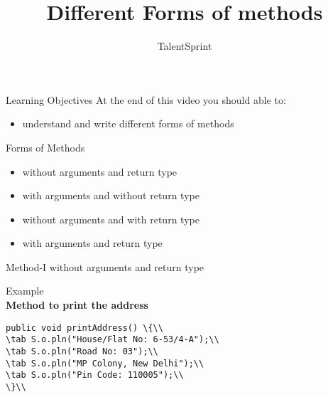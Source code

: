 \documentclass[aspectratio=169,14pt,usenames,dvipsnames]{beamer}
\title[Different Forms of methods]{Different Forms of methods}
\newcommand\tab[1][1cm]{\hspace*{#1}}
\begin{document}
{\1
\begin{frame} \vspace{35pt}

\subtitle{TalentSprint}
\maketitle
\end{frame}
}

\begin{frame}{Learning Objectives}
At the end of this video you should able to:
\begin{itemize}
\item understand and write different forms of
methods
\end{itemize}
\end{frame}

\begin{frame}{Forms of Methods}
\begin{itemize}
    \item without arguments and return type
    \item with arguments and without return type
    \item without arguments and with return type
    \item with arguments and return type
\end{itemize}
\end{frame}



\begin{frame}{Method-I}
without arguments and return type\\
\begin{block}{Example}\\
\textbf{Method to print the address}\\
\begin{lstlisting}
public void printAddress() \{\\
\tab S.o.pln("House/Flat No: 6-53/4-A");\\
\tab S.o.pln("Road No: 03");\\
\tab S.o.pln("MP Colony, New Delhi");\\
\tab S.o.pln("Pin Code: 110005");\\
\}\\
\end{lstlisting}
\end{block}

\end{frame}
\end{document}
